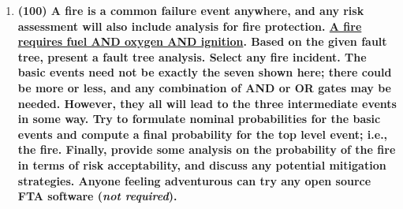 \documentclass[11pt,a4paper]{article}
\begin{document}
\begin{enumerate}[leftmargin=*,topsep=0pt,font=\bfseries]
        \newpage
    \item\textbf{(100) A fire is a common failure event anywhere, and any risk assessment will also include analysis for fire protection. \href{https://images.sampletemplates.com/wp-content/uploads/2016/06/02114906/Fault-Tree-Analysis-Format.jpg}{A fire requires fuel AND oxygen AND ignition}. Based on the given fault tree, present a fault tree analysis. Select any fire incident. The basic events need not be exactly the seven shown here; there could be more or less, and any combination of AND or OR gates may be needed. However, they all will lead to the three intermediate events in some way. Try to formulate nominal probabilities for the basic events and compute a final probability for the top level event; i.e., the fire. Finally, provide some analysis on the probability of the fire in terms of risk acceptability, and discuss any potential mitigation strategies. Anyone feeling adventurous can try any open source FTA software (\textit{not required}).}
        \vspace{\baselineskip}
        
        
        
        
        
        
        
        
        
        
        
        
        
        
        
        
        
        
        
        
        
        
        
        
        
        
        
        
        
        
        
        
        

\end{enumerate}
\end{document}
